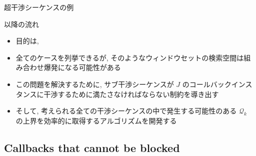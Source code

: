 \begin{frame}{超干渉シーケンスの例}
\end{frame}


\begin{frame}{以降の流れ}
    \begin{itemize}
        \item 目的は, \\ 
        \item 全てのケースを列挙できるが, そのようなウィンドウセットの検索空間は組み合わせ爆発になる可能性がある
        \item この問題を解決するために, サブ干渉シーケンスが $J$ のコールバックインスタンスに干渉するために満たさなければならない制約を導き出す
        \item そして, 考えられる全ての干渉シーケンスの中で発生する可能性のある $\mathcal{Q}_{k}$ の上界を効率的に取得するアルゴリズムを開発する
    \end{itemize}
\end{frame}


\subsection{Callbacks that cannot be blocked}
\label{ssec: callbacks_that_cannot_be_blocked}

